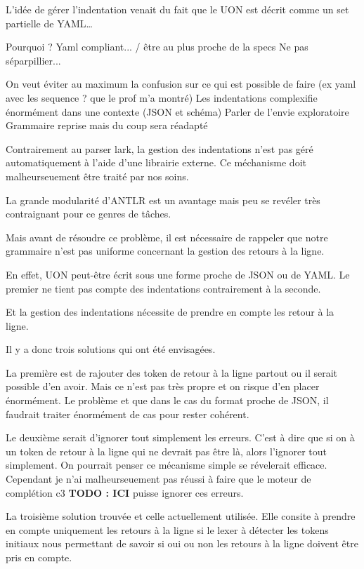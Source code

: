 \documentclass[
    iict, %
    il, %
]{heig-tb}
\begin{document}
L'idée de gérer l'indentation venait du fait que le UON est décrit comme un set partielle de YAML\dots

Pourquoi ? Yaml compliant... / être au plus proche de la specs
Ne pas séparpillier...

On veut éviter au maximum la confusion sur ce qui est possible de faire (ex yaml avec les sequence ? que le prof m'a montré)
Les indentations complexifie énormément dans une contexte (JSON et schéma)
Parler de l'envie exploratoire
Grammaire reprise mais du coup sera réadapté

Contrairement au parser lark, la gestion des indentations n'est pas géré automatiquement à l'aide d'une librairie externe.
Ce méchanisme doit malheurseuement être traité par nos soins.

La grande modularité d'ANTLR est un avantage mais peu se revéler très contraignant pour ce genres de tâches.

Mais avant de résoudre ce problème, il est nécessaire de rappeler que notre grammaire n'est pas uniforme concernant la gestion des retours à la ligne.

En effet, UON peut-être écrit sous une forme proche de JSON ou de YAML. Le premier ne tient pas compte des indentations contrairement à la seconde.

Et la gestion des indentations nécessite de prendre en compte les retour à la ligne. %

Il y a donc trois solutions qui ont été envisagées.

La première est de rajouter des token de retour à la ligne partout ou il serait possible d'en avoir. Mais ce n'est pas très propre et on risque d'en placer énormément.
Le problème et que dans le cas du format proche de JSON, il faudrait traiter énormément de cas pour rester cohérent.

Le deuxième serait d'ignorer tout simplement les erreurs. C'est à dire que si on à un token de retour à la ligne qui ne devrait pas être là, alors l'ignorer tout simplement.
On pourrait penser ce mécanisme simple se révelerait efficace. Cependant je n'ai malheurseuement pas réussi à faire que le moteur de complétion c3 \textbf{TODO : ICI}
puisse ignorer ces erreurs.

La troisième solution trouvée et celle actuellement utilisée. Elle consite à prendre en compte uniquement les retours à la ligne si le lexer à détecter les tokens initiaux
nous permettant de savoir si oui ou non les retours à la ligne doivent être pris en compte.
\end{document}
